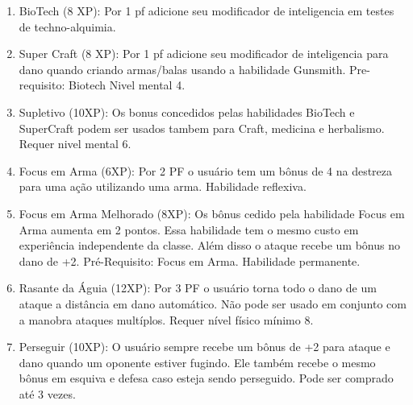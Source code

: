 \begin{enumerate}

	
	\item BioTech (8 XP): Por 1 pf adicione seu modificador de inteligencia em testes de techno-alquimia.

	\item Super Craft (8 XP): Por 1 pf adicione seu modificador de inteligencia para dano quando criando armas/balas usando a habilidade Gunsmith. Pre-requisito: Biotech Nivel mental 4.
	
	\item Supletivo (10XP): Os bonus concedidos pelas habilidades BioTech e SuperCraft podem ser usados tambem para Craft, medicina e herbalismo. Requer nivel mental 6.
	
	\item Focus em Arma (6XP): Por 2 PF o usuário tem um bônus de 4 na destreza para uma ação utilizando uma arma. Habilidade reflexiva.

	\item Focus em Arma Melhorado (8XP): Os bônus cedido pela habilidade Focus em Arma aumenta em 2 pontos. Essa habilidade tem o mesmo custo em experiência independente da classe. Além disso o ataque recebe um bônus no dano de +2. Pré-Requisito: Focus em Arma. Habilidade permanente.


	\item Rasante da Águia (12XP): Por 3 PF o usuário torna todo o dano de um ataque a distância em dano automático. Não pode ser usado em conjunto com a manobra ataques multíplos. Requer nível físico mínimo 8. 

	\item Perseguir (10XP): O usuário sempre recebe um bônus de +2 para ataque e dano quando um oponente estiver fugindo. Ele também recebe o mesmo bônus em esquiva e defesa caso esteja sendo perseguido. Pode ser comprado até 3 vezes.



\end{enumerate}
